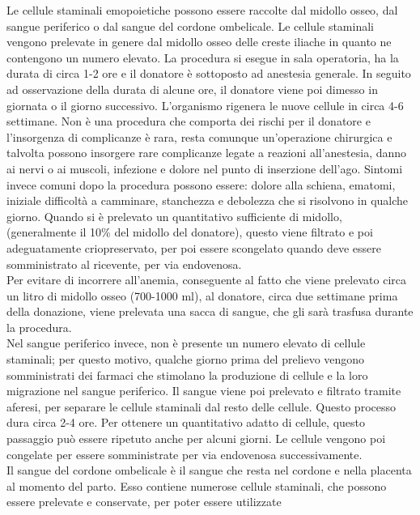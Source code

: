 Le cellule staminali emopoietiche possono essere raccolte dal midollo osseo, dal sangue periferico o dal sangue del 
cordone ombelicale. 
Le cellule staminali vengono prelevate in genere dal midollo osseo delle creste iliache in quanto ne contengono un 
numero elevato. La procedura si esegue in sala operatoria, ha la durata di circa 1-2 ore e il donatore è sottoposto 
ad anestesia generale. In seguito ad osservazione della durata di alcune ore, il donatore viene poi dimesso in giornata
o il giorno successivo. L’organismo rigenera le nuove cellule in circa 4-6 settimane. 
Non è una procedura che comporta dei rischi per il donatore e l’insorgenza di complicanze è rara, resta comunque 
un’operazione chirurgica e talvolta possono insorgere rare complicanze legate a  reazioni all’anestesia, danno ai 
nervi o ai muscoli, infezione e  dolore nel punto di inserzione dell’ago. 
Sintomi invece comuni dopo la procedura possono essere: dolore alla schiena, ematomi, iniziale difficoltà a camminare, 
stanchezza e debolezza che si risolvono in qualche giorno. 
Quando si è prelevato un quantitativo sufficiente di midollo, (generalmente il 10\% del midollo del donatore), 
questo viene filtrato e poi adeguatamente criopreservato, per poi essere scongelato quando deve essere somministrato 
al ricevente, per via endovenosa\cite{STEMCELLS}.\\
Per evitare di incorrere all’anemia, conseguente al fatto che viene prelevato circa un litro di midollo osseo 
(700-1000 ml), al donatore, circa due settimane prima della donazione, viene prelevata una sacca di sangue, 
che gli sarà trasfusa durante la procedura\cite{TRAPIANTO}.\\
Nel sangue periferico invece, non è presente un numero elevato di cellule staminali; per questo motivo, qualche 
giorno prima del prelievo vengono somministrati dei farmaci che stimolano  la produzione di cellule e la loro 
migrazione nel sangue periferico. Il sangue viene poi prelevato e filtrato tramite aferesi, per separare le cellule 
staminali dal resto delle cellule. Questo  processo dura circa 2-4 ore. Per ottenere un quantitativo adatto di cellule,
questo passaggio può essere ripetuto anche per alcuni giorni. 
Le cellule vengono poi congelate per essere somministrate per via endovenosa successivamente\cite{STEMCELLS}.\\
Il sangue del cordone ombelicale è il sangue che resta nel cordone e nella placenta al momento del parto. 
Esso contiene numerose cellule staminali, che possono essere prelevate e conservate, per poter essere utilizzate 
